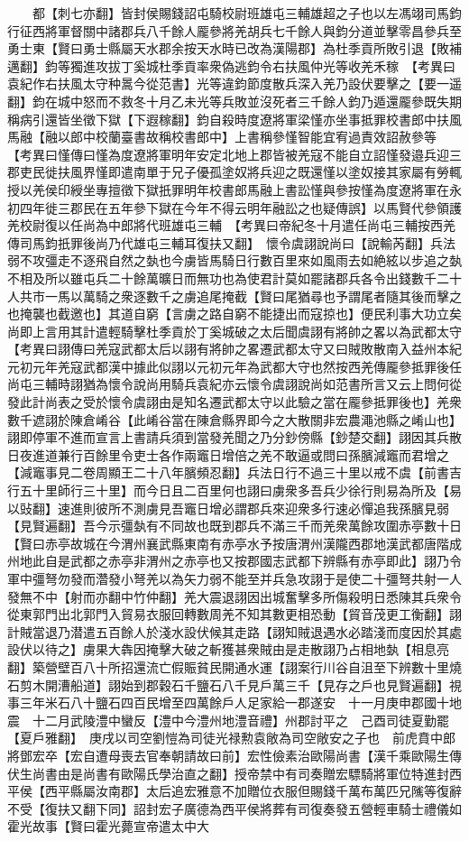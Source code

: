　　都【刺七亦翻】皆封侯賜錢詔屯騎校尉班雄屯三輔雄超之子也以左馮翊司馬鈞行征西將軍督關中諸郡兵八千餘人龎參將羌胡兵七千餘人與鈞分道並擊零昌參兵至勇士東【賢曰勇士縣屬天水郡余按天水時已改為漢陽郡】為杜季貢所敗引退【敗補邁翻】鈞等獨進攻拔丁奚城杜季貢率衆偽逃鈞令右扶風仲光等收羌禾稼　【考異曰袁紀作右扶風太守种暠今從范書】光等違鈞節度散兵深入羌乃設伏要擊之【要一遥翻】鈞在城中怒而不救冬十月乙未光等兵敗並沒死者三千餘人鈞乃遁還龎參既失期稱病引還皆坐徵下獄【下遐稼翻】鈞自殺時度遼將軍梁慬亦坐事抵罪校書郎中扶風馬融【融以郎中校蘭臺書故稱校書郎中】上書稱參慬智能宜宥過責效詔赦參等　【考異曰慬傳曰慬為度遼將軍明年安定北地上郡皆被羌寇不能自立詔慬發邉兵迎三郡吏民徙扶風界慬即遣南單于兄子優孤塗奴將兵迎之既還慬以塗奴接其家屬有勞輒授以羌侯印綬坐專擅徵下獄扺罪明年校書郎馬融上書訟慬與參按慬為度遼將軍在永初四年徙三郡民在五年參下獄在今年不得云明年融訟之也疑傳誤】以馬賢代參領護羌校尉復以任尚為中郎將代班雄屯三輔　【考異曰帝紀冬十月遣任尚屯三輔按西羌傳司馬鈞扺罪後尚乃代雄屯三輔耳復扶又翻】　懷令虞詡說尚曰【說輸芮翻】兵法弱不攻彊走不逐飛自然之埶也今虜皆馬騎日行數百里來如風雨去如絶絃以步追之埶不相及所以雖屯兵二十餘萬曠日而無功也為使君計莫如罷諸郡兵各令出錢數千二十人共市一馬以萬騎之衆逐數千之虜追尾掩截【賢曰尾猶尋也予謂尾者隨其後而擊之也掩襲也截邀也】其道自窮【言虜之路自窮不能捷出而寇掠也】便民利事大功立矣尚即上言用其計遣輕騎擊杜季貢於丁奚城破之太后聞虞詡有將帥之畧以為武都太守　【考異曰詡傳曰羌寇武都太后以詡有將帥之畧遷武都太守又曰賊敗散南入益州本紀元初元年羌寇武都漢中據此似詡以元初元年為武都大守也然按西羌傳龎參抵罪後任尚屯三輔時詡猶為懷令說尚用騎兵袁紀亦云懷令虞詡說尚如范書所言又云上問何從發此計尚表之受於懷令虞詡由是知名遷武都太守以此驗之當在龎參抵罪後也】羌衆數千遮詡於陳倉崤谷【此崤谷當在陳倉縣界即今之大散關非宏農澠池縣之崤山也】詡即停軍不進而宣言上書請兵須到當發羌聞之乃分鈔傍縣【鈔楚交翻】詡因其兵散日夜進道兼行百餘里令吏士各作兩竈日增倍之羌不敢逼或問曰孫臏減竈而君增之【減竈事見二卷周顯王二十八年臏頻忍翻】兵法日行不過三十里以戒不虞【前書吉行五十里師行三十里】而今日且二百里何也詡曰虜衆多吾兵少徐行則易為所及【易以䜴翻】速進則彼所不測虜見吾竈日增必謂郡兵來迎衆多行速必憚追我孫臏見弱【見賢遍翻】吾今示彊埶有不同故也既到郡兵不滿三千而羌衆萬餘攻圍赤亭數十日【賢曰赤亭故城在今渭州襄武縣東南有赤亭水予按唐渭州漢隴西郡地漢武都唐階成州地此自是武都之赤亭非渭州之赤亭也又按郡國志武都下辨縣有赤亭即此】詡乃令軍中彊弩勿發而濳發小弩羌以為矢力弱不能至并兵急攻詡于是使二十彊弩共射一人發無不中【射而亦翻中竹仲翻】羌大震退詡因出城奮擊多所傷殺明日悉陳其兵衆令從東郭門出北郭門入貿易衣服回轉數周羌不知其數更相恐動【貿音茂更工衡翻】詡計賊當退乃潜遣五百餘人於淺水設伏候其走路【詡知賊退遇水必踏淺而度因於其處設伏以待之】虜果大犇因掩擊大破之斬獲甚衆賊由是走散詡乃占相地埶【相息亮翻】築營壁百八十所招還流亡假賑貧民開通水運【詡案行川谷自沮至下辨數十里燒石剪木開漕船道】詡始到郡穀石千鹽石八千見戶萬三千【見存之戶也見賢遍翻】視事三年米石八十鹽石四百民增至四萬餘戶人足家給一郡遂安　十一月庚申郡國十地震　十二月武陵澧中蠻反【澧中今澧州地澧音禮】州郡討平之　己酉司徒夏勤罷【夏戶雅翻】　庚戌以司空劉愷為司徒光禄勲袁敞為司空敞安之子也　前虎賁中郎將鄧宏卒【宏自遭母喪去官奉朝請故曰前】宏性儉素治歐陽尚書【漢千乘歐陽生傳伏生尚書由是尚書有歐陽氏學治直之翻】授帝禁中有司奏贈宏驃騎將軍位特進封西平侯【西平縣屬汝南郡】太后追宏雅意不加贈位衣服但賜錢千萬布萬匹兄隲等復辭不受【復扶又翻下同】詔封宏子廣德為西平侯將葬有司復奏發五營輕車騎士禮儀如霍光故事【賢曰霍光薨宣帝遣太中大